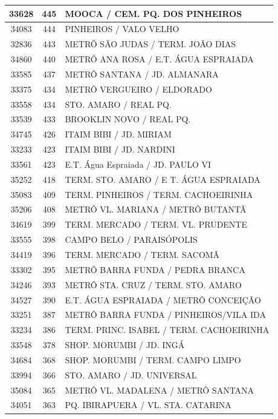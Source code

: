 \documentclass[
	12pt,				%
	oneside,			%
	a4paper,			%
	english,			%
	brazil				%
	]{abntex2ppgsi}
\begin{document}
{{\begin{apendicesenv}
\begin{longtable}{c|c|p{7cm}}
 \hline 
33628 &	445 &	MOOCA / CEM. PQ. DOS PINHEIROS \\ 
 \hline 
34083 &	444 &	PINHEIROS / VALO VELHO \\ 
 \hline 
32836 &	443 &	METRÔ SÃO JUDAS / TERM. JOÃO DIAS \\ 
 \hline 
34860 &	440 &	METRÔ ANA ROSA / E.T. ÁGUA ESPRAIADA \\ 
 \hline 
33585 &	437 &	METRÔ SANTANA / JD. ALMANARA \\ 
 \hline 
33375 &	434 &	METRÔ VERGUEIRO / ELDORADO \\ 
 \hline 
33558 &	434 &	STO. AMARO / REAL PQ. \\ 
 \hline 
33539 &	433 &	BROOKLIN NOVO / REAL PQ. \\ 
 \hline 
34745 &	426 &	ITAIM BIBI / JD. MIRIAM \\ 
 \hline 
33233 &	423 &	ITAIM BIBI / JD. NARDINI \\ 
 \hline 
33561 &	423 &	E.T. Água Espraiada / JD. PAULO VI \\ 
 \hline 
35252 &	418 &	TERM. STO. AMARO / E T. ÁGUA ESPRAIADA \\ 
 \hline 
35083 &	409 &	TERM. PINHEIROS / TERM. CACHOEIRINHA \\ 
 \hline 
35206 &	408 &	METRÔ VL. MARIANA / METRÔ BUTANTÃ \\ 
 \hline 
34619 &	399 &	TERM. MERCADO / TERM. VL. PRUDENTE \\ 
 \hline 
33555 &	398 &	CAMPO BELO / PARAISÓPOLIS \\ 
 \hline 
34419 &	396 &	TERM. MERCADO / TERM. SACOMÃ \\ 
 \hline 
33302 &	395 &	METRÔ BARRA FUNDA / PEDRA BRANCA \\ 
 \hline 
34246 &	393 &	METRÔ STA. CRUZ / TERM. STO. AMARO \\ 
 \hline 
34527 &	390 &	E.T. ÁGUA ESPRAIADA / METRÔ CONCEIÇÃO \\ 
 \hline 
33251 &	387 &	METRÔ BARRA FUNDA / PINHEIROS/VILA IDA \\ 
 \hline 
33234 &	386 &	TERM. PRINC. ISABEL / TERM. CACHOEIRINHA \\ 
 \hline 
33548 &	378 &	SHOP. MORUMBI / JD. INGÁ \\ 
 \hline 
34684 &	368 &	SHOP. MORUMBI / TERM. CAMPO LIMPO \\ 
 \hline 
33994 &	366 &	STO. AMARO / JD. UNIVERSAL \\ 
 \hline 
35084 &	365 &	METRÔ VL. MADALENA / METRÔ SANTANA \\ 
 \hline 
34051 &	363 &	PQ. IBIRAPUERA / VL. STA. CATARINA \\ 

\end{longtable}
\end{apendicesenv}}}
\end{document}
